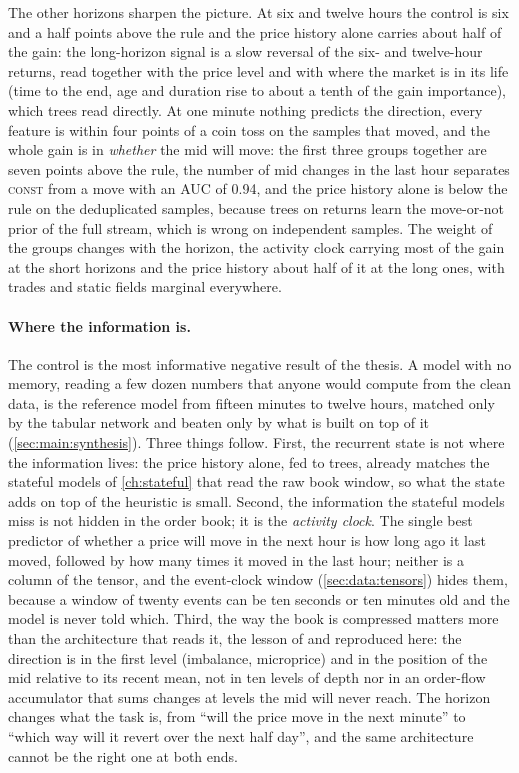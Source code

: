 \label{sec:stateless:horizons}
The other horizons sharpen the picture.  At six and twelve hours the control is six and a
half points above the rule and the price history alone carries about half of the gain: the
long-horizon signal is a slow reversal of the six- and twelve-hour returns, read together
with the price level and with where the market is in its life (time to the end, age and
duration rise to about a tenth of the gain importance), which trees read directly.  At one
minute nothing predicts the direction, every feature is within four points of a coin toss
on the samples that moved, and the whole gain is in \emph{whether} the mid will move: the
first three groups together are seven points above the rule, the number of mid changes in the last
hour separates \textsc{const} from a move with an AUC of 0.94, and the price history alone
is below the rule on the deduplicated samples, because trees on returns learn the
move-or-not prior of the full stream, which is wrong on independent samples.  The weight
of the groups changes with the horizon, the activity clock carrying most of the gain at the
short horizons and the price history about half of it at the long ones, with trades and
static fields marginal everywhere.

\paragraph{Where the information is.}
\label{sec:analysis:nostate}
The control is the most informative negative result of the thesis.  A model with no
memory, reading a few dozen numbers that anyone would compute from the clean data, is the
reference model from fifteen minutes to twelve hours, matched only by the tabular network
and beaten only by what is built on top of it (\cref{sec:main:synthesis}).  Three
things follow.  First, the recurrent state is not where the information lives: the price
history alone, fed to trees, already matches the stateful models of \cref{ch:stateful}
that read the raw book window, so what the state adds on top of the heuristic is small.
Second, the information the stateful models miss is not hidden in the order book; it is the
\emph{activity clock}.  The single best predictor of whether a price will move in the next
hour is how long ago it last moved, followed by how many times it moved in the last hour;
neither is a column of the tensor, and the event-clock window (\cref{sec:data:tensors})
hides them, because a window of twenty events can be ten seconds or ten minutes old and
the model is never told which.  Third, the way the book is compressed matters more than the
architecture that reads it, the lesson of \textcite{kolm2023dofi} and
\textcite{lucchese2024predictability} reproduced here: the direction is in the first level
(imbalance, microprice) and in the position of the mid relative to its recent mean, not in
ten levels of depth nor in an order-flow accumulator that sums changes at levels the mid
will never reach.  The horizon changes what the task is, from ``will the price move in the
next minute'' to ``which way will it revert over the next half day'', and the same
architecture cannot be the right one at both ends.

